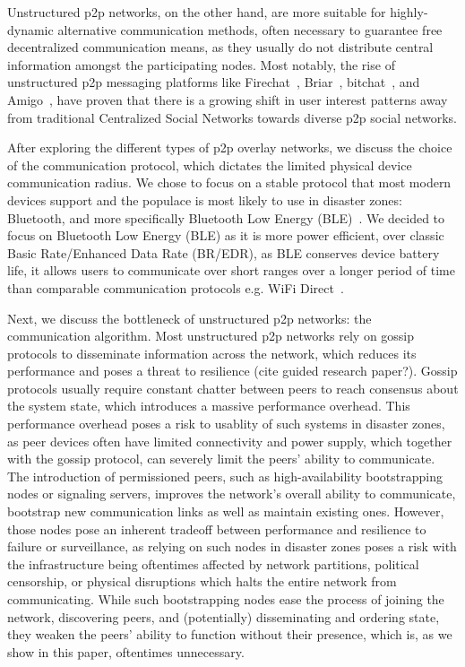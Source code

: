 Unstructured p2p networks, on the other hand, are more suitable for highly-dynamic alternative communication methods, often necessary to guarantee free decentralized communication means, as they usually do not distribute central information amongst the participating nodes.
Most notably, the rise of unstructured p2p messaging platforms like Firechat~\cite{firechat1}, Briar~\cite{briar}, bitchat~\cite{bitchat}, and Amigo~\cite{Inyangson2025}, have proven that there is a growing shift in user interest patterns away from traditional Centralized Social Networks towards diverse p2p social networks.

After exploring the different types of p2p overlay networks, we discuss the choice of the communication protocol, which dictates the limited physical device communication radius.
We chose to focus on a stable protocol that most modern devices support and the populace is most likely to use in disaster zones: Bluetooth, and more specifically Bluetooth Low Energy (BLE)~\cite{bt-spec}.
We decided to focus on Bluetooth Low Energy (BLE) as it is more power efficient, over classic Basic Rate/Enhanced Data Rate (BR/EDR), as BLE conserves device battery life, it allows users to communicate over short ranges over a longer period of time than comparable communication protocols e.g. WiFi Direct~\cite{Friedman2013}.

Next, we discuss the bottleneck of unstructured p2p networks: the communication algorithm.
Most unstructured p2p networks rely on gossip protocols to disseminate information across the network, which reduces its performance and poses a threat to resilience (cite guided research paper?).
Gossip protocols usually require constant chatter between peers to reach consensus about the system state, which introduces a massive performance overhead.
This performance overhead poses a risk to usablity of such systems in disaster zones, as peer devices often have limited connectivity and power supply, which together with the gossip protocol, can severely limit the peers' ability to communicate.
The introduction of permissioned peers, such as high-availability bootstrapping nodes or signaling servers, improves the network's overall ability to communicate, bootstrap new communication links as well as maintain existing ones. However, those nodes pose an inherent tradeoff between performance and resilience to failure or surveillance, as relying on such nodes in disaster zones poses a risk with the infrastructure being oftentimes affected by network partitions, political censorship, or physical disruptions which halts the entire network from communicating.
While such bootstrapping nodes ease the process of joining the network, discovering peers, and (potentially) disseminating and ordering state, they weaken the peers' ability to function without their presence, which is, as we show in this paper, oftentimes unnecessary.


